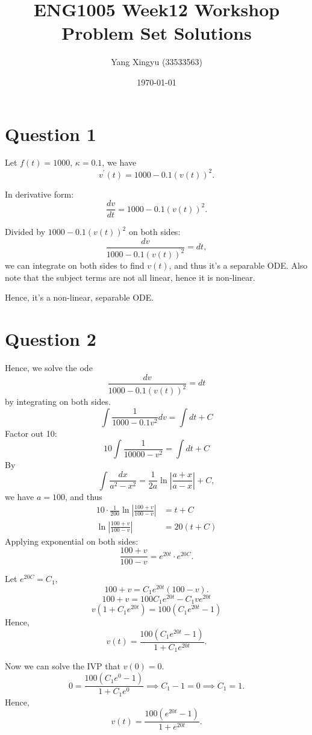 \documentclass[12pt,a4paper]{article}
\begin{document}
\title{ENG1005 Week12 Workshop Problem Set Solutions}
\author{Yang Xingyu (33533563)}
\date{\today}
\maketitle

\section*{Question 1}
Let $f(t) = 1000$, $\kappa = 0.1$, we have
\[
v^{\prime}(t)= 1000-0.1(v(t))^2.
\]

In derivative form:
\[
\frac{dv}{dt} = 1000-0.1(v(t))^2.
\]

Divided by $1000-0.1(v(t))^2$ on both sides:
\[
\frac{dv}{1000-0.1(v(t))^2} = dt,
\]
we can integrate on both sides to find $v(t)$, and thus it's a separable ODE. 
Also note that the subject terms are not all linear, hence it is non-linear.

Hence, it's a non-linear, separable ODE.

\section*{Question 2}
Hence, we solve the ode
\[
\frac{dv}{1000-0.1(v(t))^2} = dt
\]
by integrating on both sides.
\[
\int \frac{1}{1000-0.1v^{2}} dv =\int dt+C
\]
Factor out 10:
\[
10\int \frac{1}{10000-v^2}=\int dt+C
\]
By
\[
\int \frac{d x}{a^2-x^2}=\frac{1}{2 a} \ln \left|\frac{a+x}{a-x}\right|+C,
\]
we have $a = 100$, and thus
$$\begin{aligned}
10 \cdot \frac{1}{200} \ln\left|\frac{100+v}{100-v}\right| &= t+C \\
\ln\left|\frac{100+v}{100-v}\right| &= 20(t+C)
\end{aligned}$$
Applying exponential on both sides:
\[
\frac{100+v}{100-v} = e^{20t}\cdot e^{20C}.
\]

Let $e^{20C} = C_1$,
\[
100+v = C_1 e^{20 t}(100-v).
\]
\[
100+v = 100C_1e^{20t} - C_1 ve^{20t}
\]
\[
v(1+C_1e^{20t}) = 100\left(C_1 e^{20 t}-1\right)
\]
Hence,
\[
v(t)=\frac{100\left(C_1 e^{20 t}-1\right)}{1+C_1 e^{20 t}}.
\]

Now we can solve the IVP that $v(0) = 0$.
\[
0=\frac{100\left(C_1 e^0-1\right)}{1+C_1 e^0}
\implies
C_1-1=0
\implies
C_1 = 1.
\]
Hence,
\[
v(t)=\frac{100\left( e^{20 t}-1\right)}{1+e^{20 t}}.
\]
\end{document}
